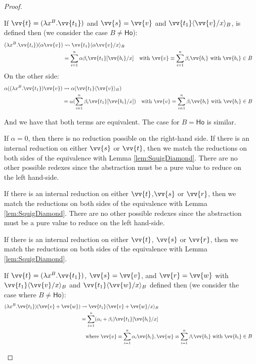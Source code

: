 \documentclass[runningheads,orivec,envcountsame,envcountsect]{llncs}
\newcommand\ansubst[2]{\ensuremath{\langle #1 \rangle_{#2}}}
\newcommand\AbsBasis{\ensuremath{\mathsf{Ho}}}
\def\Lam#1#2#3{\lambda#1^{#2}{.}#3} %
\def\lraneq{\rightsquigarrow}
\begin{document}
\begin{proof}
\begin{description}
    If $\vv{t} = (\Lam{x}{B}{\vv{t_1}})$ and $\vv{s}=\vv{v}$ and $\vv{t_1}\ansubst{\vv{v}/x}{B}$, is defined then (we consider the case $B\neq\AbsBasis$):
    \begin{align*}
      (\Lam{x}{B}{\vv{t_i}}) (\alpha\vv{v}) &\lraneq \vv{t_1}\ansubst{\alpha\vv{v}/x}{B}\\
      &= \sum_{i=1}^{n} \alpha\beta_i \vv{t_1}[\vv{b_i}/x]\quad \text{with }\vv{v}\equiv\sum_{i=1}^{n} \beta_i \vv{b_i} \text{ with } \vv{b_i}\in B\\
    \end{align*}
    On the other side:
    \begin{align*}
      \alpha ((\Lam{x}{B}{\vv{t_1}}) \vv{v}) &\lraneq \alpha(\vv{t_1}\ansubst{\vv{v}}{B})\\
      &=\alpha(\sum_{i=1}^{n} \beta_i \vv{t_1}[\vv{b_i}/x])\quad \text{with }\vv{v}\equiv\sum_{i=1}^{n} \beta_i \vv{b_i} \text{ with } \vv{b_i}\in B\\
    \end{align*}

    And we have that both terms are equivalent. The case for $B=\AbsBasis$ is similar.

    \item[$(\alpha\vv{t})\vv{s}\equiv\alpha(\vv{t}\vv{s})$:] If $\alpha=0$, then there is no reduction possible on the right-hand side. If there is an internal reduction on either $\vv{s}$ or $\vv{t}$, then we match the reductions on both sides of the equivalence with Lemma \ref{lem:SquigDiamond}. There are no other possible redexes since the abstraction must be a pure value to reduce on the left hand-side.
    
    \item[$(\vv{t}+\vv{s})\vv{r}\equiv \vv{t}\vv{s} + \vv{t}\vv{r}$:] If there is an internal reduction on either $\vv{t}$,$\vv{s}$ or $\vv{r}$, then we match the reductions on both sides of the equivalence with Lemma \ref{lem:SquigDiamond}. There are no other possible redexes since the abstraction must be a pure value to reduce on the left hand-side.
    
    \item[$\vv{t}(\vv{s}+\vv{r})\equiv\vv{t}\vv{s} + \vv{t}\vv{r}$:] If there is an internal reduction on either $\vv{t}$, $\vv{s}$ or $\vv{r}$, then we match the reductions on both sides of the equivalence with Lemma \ref{lem:SquigDiamond}.
    
    If $\vv{t} = (\Lam{x}{B}{\vv{t_1}})$, $\vv{s}=\vv{v}$, and $\vv{r}=\vv{w}$ with
    $\vv{t_1}\ansubst{\vv{v}/x}{B}$ and $\vv{t_1}\ansubst{\vv{w}/x}{B}$ defined then (we consider the case where $B\neq\AbsBasis$):
    \begin{align*}
      (\Lam{x}{B}{\vv{t_1}}) (\vv{v}+\vv{w}) &\lraneq \vv{t_1}\ansubst{\vv{v}+\vv{w}/x}{B}\\
      &=\sum_{i=1}^{n}(\alpha_i+\beta_i)\vv{t_1}[\vv{b_i}/x]\\
      &\quad\text{where }\vv{v}\equiv\sum_{i=1}^{n}\alpha_i\vv{b_i},\vv{w}\equiv\sum_{i=1}^{n}\beta_i\vv{b_i}\text{ with }\vv{b_i}\in B 
    \end{align*}


\end{description}
\end{proof}
\end{document}
